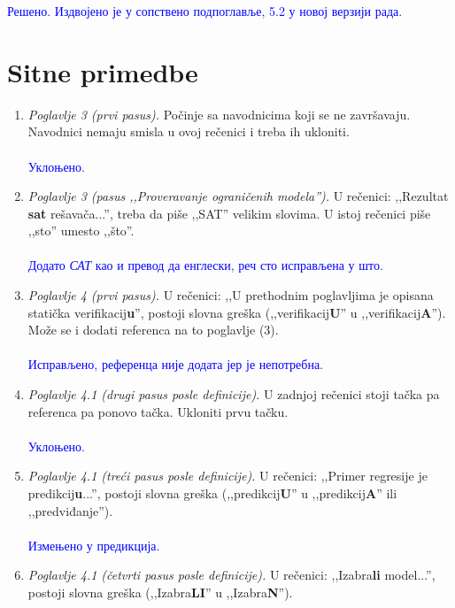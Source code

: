 \documentclass[a4paper]{report}
\newcommand{\odgovor}[1]{\textcolor{blue}{#1}}
\begin{document}
\odgovor{Решено. Издвојено је у сопствено подпоглавље, 5.2 у новој верзији рада.}

\section{Sitne primedbe}
\begin{enumerate}
	\item \textit{Poglavlje 3 (prvi pasus).} Počinje sa navodnicima koji se ne završavaju. Navodnici nemaju smisla u ovoj rečenici i treba ih ukloniti.
    \\\\
    \odgovor{Уклоњено.} 
	\\
    \item \textit{Poglavlje 3 (pasus ,,Proveravanje ograničenih modela'').} U rečenici: ,,Rezultat \textbf{sat} rešavača...'', treba da piše ,,SAT'' velikim slovima. U istoj rečenici piše ,,sto'' umesto ,,što''.
    \\\\
    \odgovor{Додато \emph{САТ} као и превод да енглески, реч сто исправљена у што.} 
	\\
	\item \textit{Poglavlje 4 (prvi pasus).} U rečenici: ,,U prethodnim poglavljima je opisana statička verifikacij\textbf{u}'', postoji slovna greška (,,verifikacij\textbf{U}'' u ,,verifikacij\textbf{A}''). Može se i dodati referenca na to poglavlje (3).
    \\\\
    \odgovor{Исправљено, референца није додата јер је непотребна.} 
	\\
	\item \textit{Poglavlje 4.1 (drugi pasus posle definicije).} U zadnjoj rečenici stoji tačka pa referenca pa ponovo tačka. Ukloniti prvu tačku.
    \\\\
    \odgovor{Уклоњено.} 
	\\
	\item \textit{Poglavlje 4.1 (treći pasus posle definicije).} U rečenici: ,,Primer regresije je predikcij\textbf{u}...'', postoji slovna greška (,,predikcij\textbf{U}'' u ,,predikcij\textbf{A}'' ili ,,predviđanje'').
    \\\\
    \odgovor{Измењено у предикција.} 
	\\
	\item \textit{Poglavlje 4.1 (četvrti pasus posle definicije).} U rečenici: ,,Izabra\textbf{li} model...'', postoji slovna greška (,,Izabra\textbf{LI}'' u ,,Izabra\textbf{N}'').

\end{enumerate}
\end{document}

